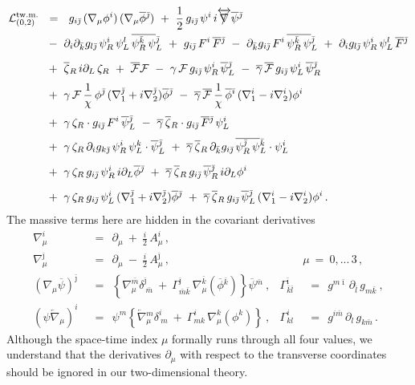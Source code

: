 \documentclass[12pt]{article}
\newcommand{\p}{\partial}
\newcommand{\ov}{\overline}
\newcommand{\mc}[1]{\mathcal{#1}}
\def\slashed#1{\setbox0=\hbox{$#1$}             %
   \dimen0=\wd0                                 %
   \setbox1=\hbox{/} \dimen1=\wd1               %
   \ifdim\dimen0>\dimen1                        %
      \rlap{\hbox to \dimen0{\hfil/\hfil}}      %
      #1                                        %
   \else                                        %
      \rlap{\hbox to \dimen1{\hfil$#1$\hfil}}   %
      /                                         %
   \fi}                                        %
\newcommand{\bzr}{\ov{\zeta}{}_R}
\newcommand{\zr}{\zeta_R}
\newcommand{\bgamma}{\ov{\gamma}}
\newcommand{\bpsi}{\ov{\psi}{}}
\newcommand{\bphi}{\ov{\phi}{}}
\newcommand{\ff}{\mc{F}}
\newcommand{\bff}{\ov{\mc{F}}}
\newcommand{\bi}{{\bar \imath}}
\newcommand{\bj}{{\bar \jmath}}
\newcommand{\bk}{{\bar k}}
\newcommand{\bl}{{\bar l}}
\newcommand{\bm}{{\bar m}}
\begin{document}
\begin{align}
%
\notag
	\mc{L}_{(0,2)}^\text{tw.m.} & ~~=~~ 
	g_{i\bj}\,(\nabla_\mu \phi^i)\, (\nabla_\mu\ov{\phi}{}^\bj)
	~+~ \frac{1}{2}\, g_{i\bj}\, \psi^i\, i\overleftrightarrow{\slashed{\nabla}} \ov{\psi}{}^\bj
	\\
%
\notag
	&~
	~-~ \p_i\p_\bk g_{l\bj}\, \psi^i_{R}\, \psi^l_{L}\, \ov{\psi^\bk_{R}\, \psi}{}^\bj_{L}
	~+~ g_{i\bj}\, F^i\,\ov{F}{}^\bj
	~-~ \p_\bk g_{i\bj}\, F^i\, \ov{\psi_R^\bk\, \psi}{}_L^\bj
	~+~ \p_i g_{l\bj}\, \psi_R^i\, \psi_L^l\, \ov{F}{}^\bj
	\\[2mm]
%
\notag
	&~
	~+~ \bzr\, i\p_L\, \zr ~+~ \bff \ff 
	~-~ \gamma\, \ff\, g_{i\bj}\, \psi_R^i\, \bpsi_L^\bj 
	~-~ \bgamma\, \bff\, g_{i\bj}\, \psi_L^i\, \bpsi_R^\bj
	\\[1mm]
%
\label{geomlin}
	&~
	~+~ \gamma\, \ff\, \frac{1}{\chi}\,\phi^\bj\, (\nabla_1^\bj + i \nabla_2^\bj) \bphi^\bj
	~-~ \bgamma\, \bff\, \frac{1}{\chi}\,\bphi^\bi\, (\nabla_1^i - i \nabla_2^i) \phi^i
	\\[1mm]
%
\notag
	&~
	~+~ \gamma\,\zr\cdot g_{i\bj}\, F^i\, \bpsi_L^\bj
	~-~ \bgamma\, \bzr\cdot g_{i\bj}\, \ov{F}{}^\bj\, \psi_L^i
	\\[1mm]
%
\notag
	&~
	~+~ \gamma\, \zr\, \p_i g_{k\bj}\, \psi_R^i\, \psi_L^k \cdot \bpsi_L^\bj
	~+~ \bgamma\, \bzr\, \p_\bk g_{i\bj}\, \ov{\psi_R^\bj\, \psi}{}_L^\bk \cdot \psi_L^i
	\\[2mm]
%	
\notag
	&~
	~+~ \gamma\, \zr\, g_{i\bj}\, \psi_R^i\, i\p_L \bphi^\bj
	~+~ \bgamma\, \bzr\, g_{i\bj}\, \bpsi_R^\bj\, i\p_L \phi^i
	\\[2mm]
%
\notag
	&~
	~+~ \gamma\, \zr\, g_{i\bj}\, \psi_L^i\, (\nabla_1^\bj + i\nabla_2^\bj) \bphi^\bj
	~+~ \bgamma\, \bzr\, g_{i\bj}\, \bpsi_L^\bj\, (\nabla_1^i - i\nabla_2^i) \phi^i
	\,.
\end{align}
	The massive terms here are hidden in the covariant derivatives
\begin{align*}
%
	\nabla_\mu^i & ~~=~~ \p_\mu ~+~ \frac{i}{2}\,A_\mu^i\,,  \\[3mm]
%
	\nabla_\mu^\bj & ~~=~~ \p_\mu ~-~ \frac{i}{2}\,A_\mu^\bj \,,
	&& \!\!\!\!\!\!\! \mu ~=~ 0,...\,3\,,
	\\[3mm]
%
	(\nabla_\mu \ov{\psi})^\bj & ~~=~~ \left\{ \nabla_\mu^\bm \delta^\bj_{\ \bm} ~+~
						\Gamma_{\bm\bk}^\bj\, \nabla_\mu^\bk (\ov{\phi}{}^\bk) \right\} \ov{\psi}{}^\bm~,
	& \Gamma^\bi_{\bk\bl} & ~~=~~ g^{m\bi}\,\p_\bl\, g_{m\bk}~,
	\\[3mm]
%
	(\psi \overleftarrow{\nabla}{}_\mu)^i & ~~=~~ 
			\psi^m \left\{ \overleftarrow{\nabla}{}_\mu^m \delta^i_{\ m} ~+~
						\Gamma^i_{mk}\, \nabla_\mu^k (\phi^k) \right\}~,
	& \Gamma^i_{kl} & ~~=~~ g^{i\bm}\, \p_l\, g_{k\bm}\,.
\end{align*}
	Although the space-time index $\mu$ formally runs through all four values, we understand
	that the derivatives $ \p_\mu $ with respect to the transverse coordinates should be ignored in our two-dimensional
	theory.
\end{document}
